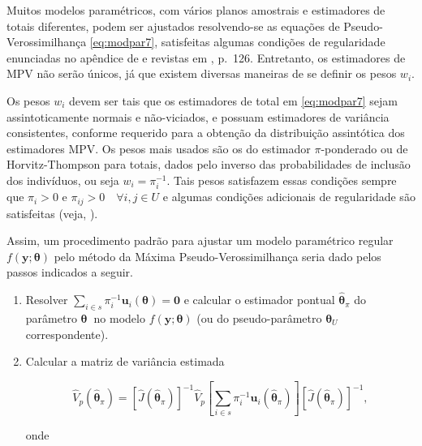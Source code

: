 \documentclass[]{book}
\numberwithin{example}{chapter}
\numberwithin{remark}{chapter}
\numberwithin{definition}{chapter}
\begin{document}
Muitos modelos paramétricos, com vários planos amostrais e estimadores
de totais diferentes, podem ser ajustados resolvendo-se as equações de
Pseudo-Verossimilhança \eqref{eq:modpar7}, satisfeitas algumas condições
de regularidade enunciadas no apêndice de \citep{binder83} e revistas em
\citep{Silva}, p.~126. Entretanto, os estimadores de MPV não serão
únicos, já que existem diversas maneiras de se definir os pesos
\(w_{i}\).

Os pesos \(w_{i}\) devem ser tais que os estimadores de total em
\eqref{eq:modpar7} sejam assintoticamente normais e não-viciados, e
possuam estimadores de variância consistentes, conforme requerido para a
obtenção da distribuição assintótica dos estimadores MPV. Os pesos mais
usados são os do estimador \(\pi\)-ponderado ou de Horvitz-Thompson para
totais, dados pelo inverso das probabilidades de inclusão dos
indivíduos, ou seja \(w_{i}=\pi _{i}^{-1}\). Tais pesos satisfazem essas
condições sempre que \(\pi _{i}>0\) e
\(\pi _{ij}>0\quad \forall i,j\in U\) e algumas condições adicionais de
regularidade são satisfeitas (veja, \citep{fuller84}).

Assim, um procedimento padrão para ajustar um modelo paramétrico regular
\(f\left( \mathbf{y};\mathbf{\theta }\right)\) pelo método da Máxima
Pseudo-Verossimilhança seria dado pelos passos indicados a seguir.

\begin{enumerate}
\def\labelenumi{\arabic{enumi}.}
\item
  Resolver
  \(\sum\limits_{i\in s}\pi _{i}^{-1}\mathbf{u}_{i}\left( \mathbf{\theta }\right) =\mathbf{0}\)
  e calcular o estimador pontual \(\mathbf{ \hat{\theta}}_{\pi }\) do
  parâmetro \(\mathbf{\theta }\)\textbf{\ }no modelo
  \(f\left( \mathbf{y;\theta }\right)\) (ou do pseudo-parâmetro
  \(\mathbf{\theta }_{U}\) correspondente).
\item
  Calcular a matriz de variância estimada

  \begin{equation}
  \hat{V}_{p}\left( \mathbf{\hat{\theta}}_{\pi }\right) =\left[ \hat{J}\left( 
  \mathbf{\hat{\theta}}_{\pi }\right) \right] ^{-1}\hat{V}_{p}\left[
  \sum\limits_{i\in s}\pi _{i}^{-1}\mathbf{u}_{i}\left( \mathbf{\hat{\theta}}
  _{\pi }\right) \right] \left[ \hat{J}\left( \mathbf{\hat{\theta}}_{\pi
  }\right) \right] ^{-1},  
  \label{eq:modpar13}
  \end{equation}

  onde
\end{enumerate}
\end{document}
